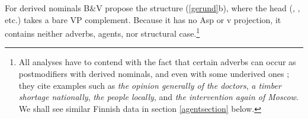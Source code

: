 \documentclass[output=paper,
modfonts
]{LSP/langsci}
\newcommand{\rfa}[2]{(\ref{#1}{#2})}
\def\urf#1{$^{\textrm{\scriptsize{#1}}}$}
\begin{document}
%
%
%
For derived nominals B\&V propose the structure \rfa{gerund}{b}, where the head
(\form{-ing\urf{N}}, , etc.)  takes a bare VP complement. Because it has no Asp
or v projection, it contains neither adverbs, agents, nor structural case.\footnote{All
  analyses have to contend with the fact that certain adverbs can occur as postmodifiers with
  derived nominals, and even with some underived ones \citep{payne2010}; they
  cite examples such as \textit{the opinion generally of the doctors}, \textit{a timber
    shortage nationally}, \textit{the people locally}, and \textit{the intervention again of
    Moscow}.  We shall see similar Finnish data in section \ref{agentsection} below.}
\end{document}
